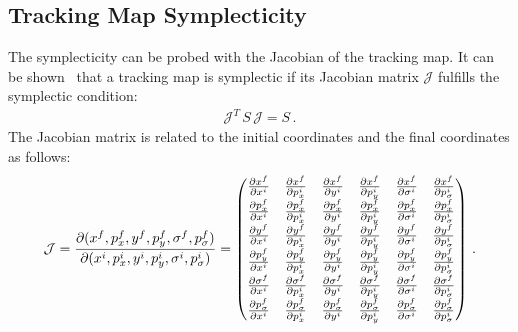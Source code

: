 
\appendix

\chapter{}



\section{Tracking Map Symplecticity} \label{chap:sympl}
The symplecticity can be probed with the Jacobian of the tracking map. It can be shown~\cite{CERN-SL-95-12} that a tracking map is symplectic if its Jacobian matrix $\mathcal{J}$ fulfills the symplectic condition:
%
\begin{align}
  \mathcal{J}^T \, S \, \mathcal{J} = S \, .
\end{align}
The Jacobian matrix is related to the initial coordinates and the final coordinates as follows:
%
\begin{align}
  \mathcal{J} = \PD{(x^f,p_x^f,y^f,p_y^f,\sigma^f,p_\sigma^f)}{(x^i,p_x^i,y^i,p_y^i,\sigma^i,p_\sigma^i)}  = %
\begin{pmatrix} 
\PD{x^f}{x^i} &
\PD{x^f}{p_x^i} &
\PD{x^f}{y^i} &
\PD{x^f}{p_y^i} &
\PD{x^f}{\sigma^i} &
\PD{x^f}{p_\sigma^i} \\
\PD{p_x^f}{x^i} &
\PD{p_x^f}{p_x^i} &
\PD{p_x^f}{y^i} &
\PD{p_x^f}{p_y^i} &
\PD{p_x^f}{\sigma^i} &
\PD{p_x^f}{p_\sigma^i} \\
\PD{y^f}{x^i} &
\PD{y^f}{p_x^i} &
\PD{y^f}{y^i} &
\PD{y^f}{p_y^i} &
\PD{y^f}{\sigma^i} &
\PD{y^f}{p_\sigma^i} \\
\PD{p_y^f}{x^i} &
\PD{p_y^f}{p_x^i} &
\PD{p_y^f}{y^i} &
\PD{p_y^f}{p_y^i} &
\PD{p_y^f}{\sigma^i} &
\PD{p_y^f}{p_\sigma^i} \\
\PD{\sigma^f}{x^i} &
\PD{\sigma^f}{p_x^i} &
\PD{\sigma^f}{y^i} &
\PD{\sigma^f}{p_y^i} &
\PD{\sigma^f}{\sigma^i} &
\PD{\sigma^f}{p_\sigma^i} \\
\PD{p_\sigma^f}{x^i} &
\PD{p_\sigma^f}{p_x^i} &
\PD{p_\sigma^f}{y^i} &
\PD{p_\sigma^f}{p_y^i} &
\PD{p_\sigma^f}{\sigma^i} &
\PD{p_\sigma^f}{p_\sigma^i} \\
\end{pmatrix} \, .
\end{align}


